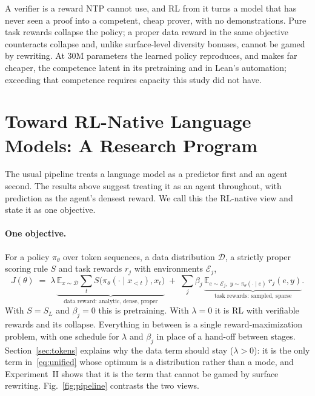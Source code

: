 \documentclass[11pt]{article}
\theoremstyle{definition}
\newcommand{\E}{\mathbb{E}}
\begin{document}
\begin{thesis}
A verifier is a reward NTP cannot use, and RL from it turns a model that has never seen a proof into a competent, cheap prover, with no demonstrations. Pure task rewards collapse the policy; a proper data reward in the same objective counteracts collapse and, unlike surface-level diversity bonuses, cannot be gamed by rewriting. At $30$M parameters the learned policy reproduces, and makes far cheaper, the competence latent in its pretraining and in Lean's automation; exceeding that competence requires capacity this study did not have.
\end{thesis}

\section{Toward RL-Native Language Models: A Research Program}\label{sec:program}

The usual pipeline treats a language model as a predictor first and an agent second. The results above suggest treating it as an agent throughout, with prediction as the agent's densest reward. We call this the RL-native view and state it as one objective.

\paragraph{One objective.} For a policy $\pi_\theta$ over token sequences, a data distribution $\mathcal D$, a strictly proper scoring rule $S$ and task rewards $r_j$ with environments $\mathcal E_j$,
\begin{equation}\label{eq:unified}
J(\theta)\;=\;\lambda\,\underbrace{\E_{x\sim\mathcal D}\sum_t S\big(\pi_\theta(\cdot\mid x_{<t}),x_t\big)}_{\text{data reward: analytic, dense, proper}}\;+\;\sum_j\beta_j\,\underbrace{\E_{e\sim\mathcal E_j,\;y\sim\pi_\theta(\cdot\mid e)}\,r_j(e,y)}_{\text{task rewards: sampled, sparse}} .
\end{equation}
With $S=S_L$ and $\beta_j=0$ this is pretraining. With $\lambda=0$ it is RL with verifiable rewards and its collapse. Everything in between is a single reward-maximization problem, with one schedule for $\lambda$ and $\beta_j$ in place of a hand-off between stages. Section~\ref{sec:tokens} explains why the data term should stay ($\lambda>0$): it is the only term in~\eqref{eq:unified} whose optimum is a distribution rather than a mode, and Experiment~II shows that it is the term that cannot be gamed by surface rewriting. Fig.~\ref{fig:pipeline} contrasts the two views.
\end{document}
